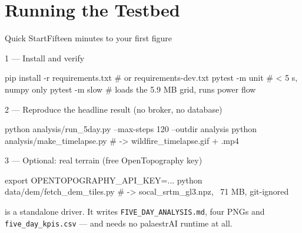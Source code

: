\documentclass[aspectratio=169,9pt]{beamer}
\newcommand{\code}[1]{{\small\texttt{#1}}}
\begin{document}
\section{Running the Testbed}

\begin{frame}[fragile]{Quick Start}{Fifteen minutes to your first figure}
  \begin{block}{1 --- Install and verify}
\begin{semiverbatim}\scriptsize
pip install -r requirements.txt      \textcolor{csladarkgray}{# or requirements-dev.txt}
pytest -m unit                       \textcolor{csladarkgray}{# < 5 s, numpy only}
pytest -m slow                       \textcolor{csladarkgray}{# loads the 5.9 MB grid, runs power flow}
\end{semiverbatim}
  \end{block}
  \begin{block}{2 --- Reproduce the headline result (no broker, no database)}
\begin{semiverbatim}\scriptsize
python analysis/run_5day.py --max-steps 120 --outdir analysis
python analysis/make_timelapse.py     \textcolor{csladarkgray}{# -> wildfire_timelapse.gif + .mp4}
\end{semiverbatim}
  \end{block}
  \begin{block}{3 --- Optional: real terrain (free OpenTopography key)}
\begin{semiverbatim}\scriptsize
export OPENTOPOGRAPHY_API_KEY=...
python data/dem/fetch_dem_tiles.py    \textcolor{csladarkgray}{# -> socal_srtm_gl3.npz, ~71 MB, git-ignored}
\end{semiverbatim}
  \end{block}
  \vskip2pt
  {\scriptsize\color{csladarkgray}\code{run\_5day.py} is a standalone driver.
   It writes \texttt{FIVE\_DAY\_ANALYSIS.md}, four PNGs and
   \texttt{five\_day\_kpis.csv} --- and needs no palaestrAI runtime at all.}
\end{frame}
\end{document}

